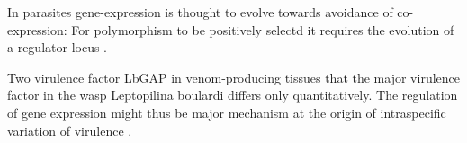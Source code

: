 In parasites gene-expression is thought to evolve towards avoidance of
co-expression: For polymorphism to be positively selectd it requires
the evolution of a regulator locus \cite{pmid15913420}.


Two virulence factor LbGAP in venom-producing tissues that the major
virulence factor in the wasp Leptopilina boulardi differs only
quantitatively. The regulation of gene expression might thus be major
mechanism at the origin of intraspecific variation of virulence
\cite{pmid21124871}.




     